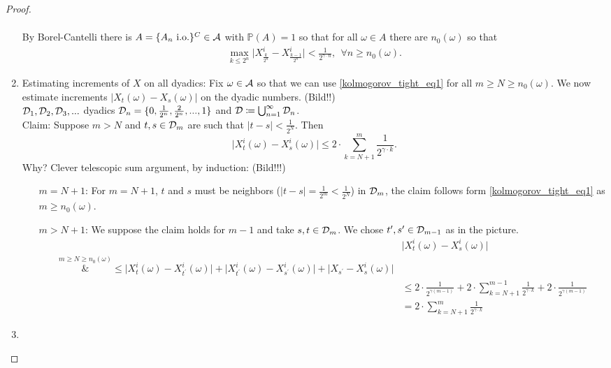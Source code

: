 \begin{proof}
\begin{enumerate}
\begin{align*}
			\end{align*}
			By Borel-Cantelli there is $A = \{ A_n \text{ i.o.}\}^C \in \mathcal{A}$ with $\mathbb{P}(A)=1$ so that for all $\omega \in A$ there are $n_0(\omega)$ so that
			\begin{align}\label{kolmogorov_tight_eq1}
				\max_{k\leq 2^n} \big\lvert X_{\frac{k}{2^n}}^i - X_{\frac{k-1}{2^n}}^i\big\rvert < \frac{1}{2^{\gamma \cdot n}}, \:\: \forall n \geq n_0(\omega).
			\end{align}
		\item\label{item_2}
			Estimating increments of $X$ on all dyadics: Fix $\omega \in \mathcal{A}$ so that we can use \ref{kolmogorov_tight_eq1} for all $m\geq N \geq n_0(\omega)$. We now estimate increments $\lvert X_t(\omega) - X_s(\omega) \rvert$ on the dyadic numbers. (Bild!!)\\
			$\mathcal{D}_1,\mathcal{D}_2,\mathcal{D}_3,...$ dyadics $\mathcal{D}_n = \{ 0, \frac{1}{2^n},\frac{2}{2^n},...,1\}$ and $\mathcal{D} \coloneqq \bigcup_{n=1}^{\infty} \mathcal{D}_n$.\\
			Claim: Suppose $m > N$ and $t,s\in \mathcal{D}_m$ are such that $\lvert t- s \rvert < \frac{1}{2^N}$. Then $$\lvert X_t^i(\omega) - X_s^i(\omega) \rvert \leq 2 \cdot \sum_{k=N+1}^{m} \frac{1}{2^{\gamma \cdot k}}.$$
			Why? Clever telescopic sum argument, by induction: (Bild!!!)
			\begin{itemize}
				\item[$m=N+1$:]	
					For $m=N+1$, $t$ and $s$ must be neighbors ($\lvert t- s \rvert = \frac{1}{2^m}< \frac{1}{2^N}$) in $\mathcal{D}_m$, the claim follows form \ref{kolmogorov_tight_eq1} as $m\geq n_0(\omega)$.
				\item[$m>N+1$:]
					We suppose the claim holds for $m-1$ and take $s,t\in \mathcal{D}_m$. We chose $t^{\prime},s^{\prime}\in\mathcal{D}_{m-1}$ as in the picture.
					\begin{align*}
						&\lvert X_t^i(\omega) - X_s^i(\omega)\rvert \\
						\overset{m \geq N \geq n_0(\omega)}&{\leq} \lvert X_t^i(\omega) - X_{t^{\prime}}^i(\omega) \rvert + \lvert X_{t^{\prime}}^i(\omega) - X_{s^{\prime}}^i(\omega) \rvert + \lvert X_{s^{\prime}} - X_s^i(\omega) \rvert \\
						&\leq 2 \cdot \frac{1}{2^{\gamma(m-1)}} + 2 \cdot \sum_{k=N+1}^{m-1} \frac{1}{2^{\gamma \cdot k}} + 2 \cdot \frac{1}{2^{\gamma(m-1)}} \\
						&= 2 \cdot \sum_{k=N+1}^{m} \frac{1}{2^{\gamma \cdot k}}
					\end{align*}
			\end{itemize}
		\item

\end{enumerate}
\end{proof}
